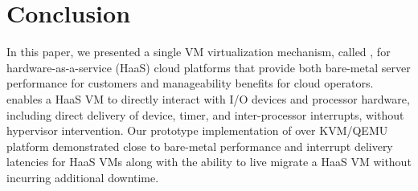 
\section{Conclusion}
\vspace{-0.05in}

In this paper, we presented a single VM virtualization 
mechanism, called \sna, for hardware-as-a-service (HaaS) cloud platforms
that provide both bare-metal server performance for customers
and manageability benefits for cloud operators.
\na enables a HaaS VM to directly interact with I/O devices and 
processor hardware, including direct delivery of device,
timer, and inter-processor interrupts, without hypervisor intervention.
Our prototype implementation of \na over KVM/QEMU platform 
demonstrated close to bare-metal performance and
interrupt delivery latencies for HaaS VMs along with the
ability to live migrate a HaaS VM without incurring 
additional downtime. 
